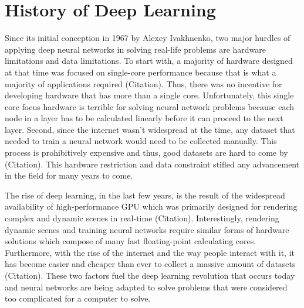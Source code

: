 \documentclass{IEEEtran}
\begin{document}
    \section{History of Deep Learning}
        Since its initial conception in 1967 by Alexey Ivakhnenko, two major hurdles of applying deep neural networks in solving real-life problems are hardware limitations and data limitations. To start with, a majority of hardware designed at that time was focused on single-core performance because that is what a majority of applications required (Citation). Thus, there was no incentive for developing hardware that has more than a single core. Unfortunately, this single core focus hardware is terrible for solving neural network problems because each node in a layer has to be calculated linearly before it can proceed to the next layer. Second, since the internet wasn’t widespread at the time, any dataset that needed to train a neural network would need to be collected manually. This process is prohibitively expensive and thus, good datasets are hard to come by (Citation). This hardware restriction and data constraint stifled any advancement in the field for many years to come.

        The rise of deep learning, in the last few years, is the result of the widespread availability of high-performance GPU which was primarily designed for rendering complex and dynamic scenes in real-time (Citation). Interestingly, rendering dynamic scenes and training neural networks require similar forms of hardware solutions which compose of many fast floating-point calculating cores. Furthermore, with the rise of the internet and the way people interact with it, it has become easier and cheaper than ever to collect a massive amount of datasets (Citation). These two factors fuel the deep learning revolution that occurs today and neural networks are being adapted to solve problems that were considered too complicated for a computer to solve.
\end{document}
